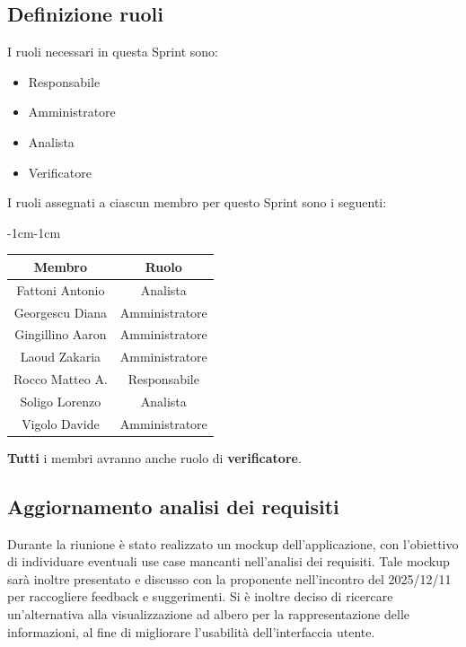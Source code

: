 \documentclass[a4paper,12pt]{article}
\begin{document}
\subsection{Definizione ruoli}
I ruoli necessari in questa Sprint sono:
\begin{itemize}[noitemsep]
    \item Responsabile
    \item Amministratore
    \item Analista
    \item Verificatore
\end{itemize}

I ruoli assegnati a ciascun membro per questo Sprint sono i seguenti:
\begin{table}[H]
    \begin{adjustwidth}{-1cm}{-1cm}
    \centering
\begin{tabular}{|c|c|}
    \hline
    \textbf{Membro} & \textbf{Ruolo} \\
    \hline
    Fattoni Antonio & Analista \\
    \hline
    Georgescu Diana & Amministratore \\
    \hline
    Gingillino Aaron & Amministratore \\
    \hline
    Laoud Zakaria & Amministratore \\
    \hline
    Rocco Matteo A. & Responsabile \\
    \hline
    Soligo Lorenzo & Analista \\
    \hline
    Vigolo Davide & Amministratore \\
    \hline
\end{tabular}
    \end{adjustwidth}
\end{table}
\textbf{Tutti} i membri avranno anche ruolo di \textbf{verificatore}.


\subsection{Aggiornamento analisi dei requisiti}
Durante la riunione è stato realizzato un mockup dell'applicazione, con l'obiettivo di individuare eventuali use case mancanti nell'analisi dei requisiti. 
Tale mockup sarà inoltre presentato e discusso con la proponente nell'incontro del 2025/12/11 per raccogliere feedback e suggerimenti. 
Si è inoltre deciso di ricercare un'alternativa alla visualizzazione ad albero per la rappresentazione delle informazioni, al fine di migliorare l'usabilità dell'interfaccia utente.
\end{document}
